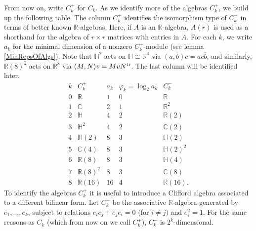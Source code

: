 \documentclass{article}
\newcommand{\C}{\mathbb{C}}
\newcommand{\R}{\mathbb{R}}
\theoremstyle{definition}
\begin{document}
From now on, write $C^+_k$ for $C_k$. As we identify more of the algebras $C^+_k$, we build up the following table. The column $C^+_k$ identifies the isomorphism type of $C^+_k$ in terms of better known $\R$-algebras. Here, if $A$ is an $\R$-algebra, $A(r)$ is used as a shorthand for the algebra of $r\times r$ matrices with entries in $A$. For each $k$, we write $a_k$ for the minimal dimension of a nonzero $C^+_k$-module (see lemma \ref{MinRepsOfAlgs}). Note that $\mathbb{H}^2$ acts on $\mathbb{H}\cong\R^4$ via $(a,b)c=ac\overline{b}$, and similarly, $\R(8)^2$ acts on $\R^8$ via $(M,N)v=MvN^\textup{tr}$. The last column will be identified later.
\[\begin{array}{c|ccccc} %
k& C^+_k& a_k & \varphi_k = \log_2 a_k &C^-_k \\\hline
0 & \R & 1 & 0 & \R \\
1 & \C & 2 & 1 & \R^2 \\
2 & \mathbb{H} & 4 & 2 & \R(2) \\
3 & \mathbb{H}^2 & 4 & 2 & \C(2) \\
4 & \mathbb{H}(2) & 8 & 3 & \mathbb{H}(2) \\
5 & \C(4) & 8 & 3 & \mathbb{H}(2)^2 \\
6 & \R(8) & 8 & 3 & \mathbb{H}(4) \\
7 & \R(8)^2 & 8 & 3 & \C(8) \\
8 & \R(16) & 16 & 4 & \R(16).
\end{array}\] %
To identify the algebras $C_k^+$ it is useful to introduce a Clifford algebra associated to a different bilinear form. Let $C_k^-$ be the associative $\R$-algebra generated by $e_1, \ldots, e_k$, subject to relations $e_ie_j+e_je_i=0$ (for $i\neq j)$ and $e_i^2=1$. For the same reasons as $C_k$ (which from now on we call $C_k^+$), $C_k^-$ is $2^k$-dimensional.
\end{document}
